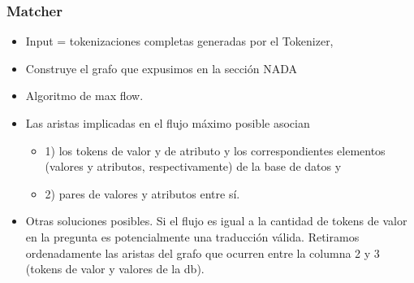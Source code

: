 \begin{frame}
\frametitle{Matcher}
  
  \begin{itemize}
    \item Input = tokenizaciones completas generadas por el Tokenizer,
    \item Construye el grafo {\color{red} que expusimos en la sección NADA}
    \item Algoritmo de max flow. \footnotemark \footnotemark
    \item Las aristas implicadas en el flujo máximo posible asocian 
    \begin{itemize}
      \item 1) los tokens de valor y de atributo y los correspondientes elementos (valores y atributos, respectivamente) de la base de datos y 
      \item 2) pares de valores y atributos entre sí.
    \end{itemize}
    \item Otras soluciones posibles. Si el flujo es igual a la cantidad de tokens de valor en la pregunta es potencialmente una traducción válida. Retiramos ordenadamente las aristas del grafo que ocurren entre la columna 2 y 3 (tokens de valor y valores de la db).
\end{itemize}






\end{frame}

